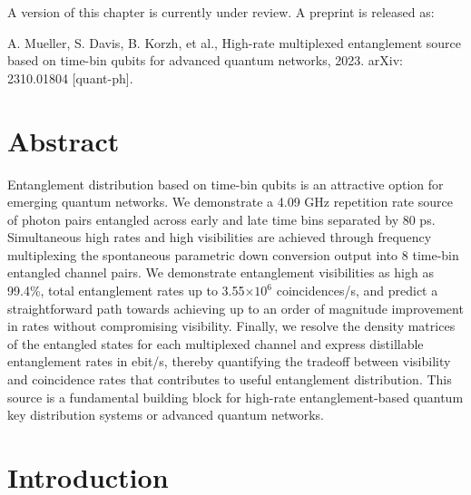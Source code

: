 \documentclass[11pt]{caltech_thesis} %
\begin{document}
A version of this chapter is currently under review. A preprint is released as:

A. Mueller, S. Davis, B. Korzh, et al., High-rate multiplexed entanglement source based on time-bin qubits for advanced quantum networks, 2023. arXiv: 2310.01804 {[}quant-ph{]}.

\hypertarget{abstract-3}{%
\section{Abstract}\label{abstract-3}}

Entanglement distribution based on time-bin qubits is an attractive option for emerging quantum networks. We demonstrate a 4.09 GHz repetition rate source of photon pairs entangled across early and late time bins separated by 80 ps. Simultaneous high rates and high visibilities are achieved through frequency multiplexing the spontaneous parametric down conversion output into 8 time-bin entangled channel pairs. We demonstrate entanglement visibilities as high as 99.4\%, total entanglement rates up to 3.55$\times 10^6$ coincidences/s, and predict a straightforward path towards achieving up to an order of magnitude improvement in rates without compromising visibility. Finally, we resolve the density matrices of the entangled states for each multiplexed channel and express distillable entanglement rates in ebit/s, thereby quantifying the tradeoff between visibility and coincidence rates that contributes to useful entanglement distribution. This source is a fundamental building block for high-rate entanglement-based quantum key distribution systems or advanced quantum networks.

\hypertarget{introduction-4}{%
\section{Introduction}\label{introduction-4}}
\end{document}
